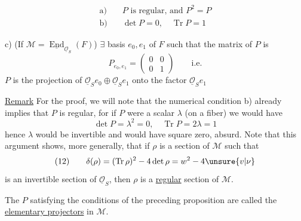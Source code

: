 \[
\begin{aligned}
\text{a)}\quad &P\text{ is regular, and }P^2=P\\
\text{b)}\quad &\det P=0,\quad\operatorname{Tr}P=1
\end{aligned}
\]

c) (If $\mathcal M=\underline{\operatorname{End}}_{\underline{\mathcal O}_S}(F)$) $\exists$ basis $e_0,e_1$ of $F$ such that the matrix of $P$ is
\[
P_{e_0,e_1}=\begin{pmatrix}0&0\\0&1\end{pmatrix}\qquad\text{i.e.}
\]
$P$ is the projection of $\underline{\mathcal O}_S e_0\oplus\underline{\mathcal O}_S e_1$ onto the factor $\underline{\mathcal O}_S e_1$


\uline{Remark}  For the proof, we will note that the numerical condition b) already implies that $P$ is regular, for if $P$ were a scalar $\lambda$ (on a fiber) we would have
\[
\det P=\lambda^2=0,\quad\operatorname{Tr}P=2\lambda=1
\]
hence $\lambda$ would be invertible and would have square zero, absurd. Note that this argument shows, more generally, that if $\rho$ is a section of $\mathcal M$ such that
\[
(12)\qquad \delta(\rho)=(\operatorname{Tr}\rho)^2-4\det\rho=w^2-4\unsure{v|\nu}
\]
is an invertible section of $\underline{\mathcal O}_S$, then $\rho$ is a \uline{regular} section of $\mathcal M$.

 The $P$  satisfying the conditions of the preceding proposition are called the \uline{elementary projectors} in $\mathcal M$. 

